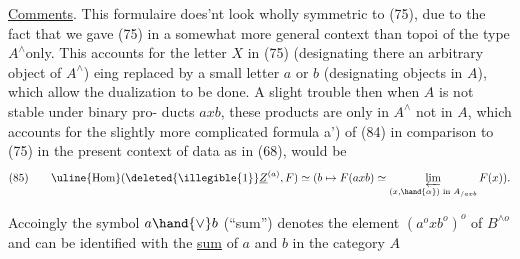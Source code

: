 \uline{Comments}. This formulaire does'nt look wholly symmetric to (75), due
to the fact that we gave (75) in a  somewhat more general context
than topoi of the type $A^{\wedge}$only. This accounts for the letter $X$ in (75)
(designating there an arbitrary object of $A^{\wedge}$) eing replaced by a small
letter $a$ or $b$ (designating objects in $A$), which allow the dualization to
be done. A slight trouble then  when $A$ is not stable under binary pro-%
ducts $axb$,  these products are only in $A^{\wedge}$ not in $A$, which accounts
for the slightly more complicated formula a') of (84) in comparison to
(75)\hand{,} 
  in the present context of data as in (68),
would be
\[ (85)\qquad \uline{\text{Hom}}(\deleted{\illegible{1}}\underline{Z}^{(a)},F) \simeq ( b \mapsto F(axb) \simeq \varprojlim_{(x,\hand{\alpha})\text{ in } A_{/axb}} F(x) ) . \]

Accoingly the symbol $a\hand{\vee}b$ (``sum'') denotes the element $(a^{o}xb^{o})^{o}$
of $B^{\wedge o}$ and can be identified with the \uline{sum} of $a$ and $b$ in the category $A$

